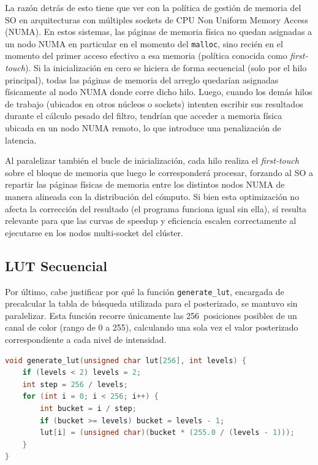 La razón detrás de esto tiene que ver con la política de gestión de memoria del SO en arquitecturas con múltiples sockets de CPU Non Uniform Memory Access (NUMA). En estos sistemas, las páginas de memoria física no quedan asignadas a un nodo NUMA en particular en el momento del \texttt{malloc}, sino recién en el momento del primer acceso efectivo a esa memoria (política conocida como \textit{first-touch}). Si la inicialización en cero se hiciera de forma secuencial (solo por el hilo principal), todas las páginas de memoria del arreglo quedarían asignadas físicamente al nodo NUMA donde corre dicho hilo. Luego, cuando los demás hilos de trabajo (ubicados en otros núcleos o sockets) intenten escribir sus resultados durante el cálculo pesado del filtro, tendrían que acceder a memoria física ubicada en un nodo NUMA remoto, lo que introduce una penalización de latencia.

Al paralelizar también el bucle de inicialización, cada hilo realiza el \textit{first-touch} sobre el bloque de memoria que luego le corresponderá procesar, forzando al SO a repartir las páginas físicas de memoria entre los distintos nodos NUMA de manera alineada con la distribución del cómputo. Si bien esta optimización no afecta la corrección del resultado (el programa funciona igual sin ella), sí resulta relevante para que las curvas de speedup y eficiencia escalen correctamente al ejecutarse en los nodos multi-socket del clúster.


\subsection{LUT Secuencial}

Por último, cabe justificar por qué la función \texttt{generate\_lut}, encargada de precalcular la tabla de búsqueda utilizada para el posterizado, se mantuvo sin paralelizar. Esta función recorre únicamente las 256~posiciones posibles de un canal de color (rango de 0 a 255), calculando una sola vez el valor posterizado correspondiente a cada nivel de intensidad.

\begin{lstlisting}[language=C, caption={Generación de la LUT para posterizado}, label=list:generate_lut]
void generate_lut(unsigned char lut[256], int levels) {
    if (levels < 2) levels = 2;
    int step = 256 / levels;
    for (int i = 0; i < 256; i++) {
        int bucket = i / step;
        if (bucket >= levels) bucket = levels - 1;
        lut[i] = (unsigned char)(bucket * (255.0 / (levels - 1)));
    }
}
\end{lstlisting}

